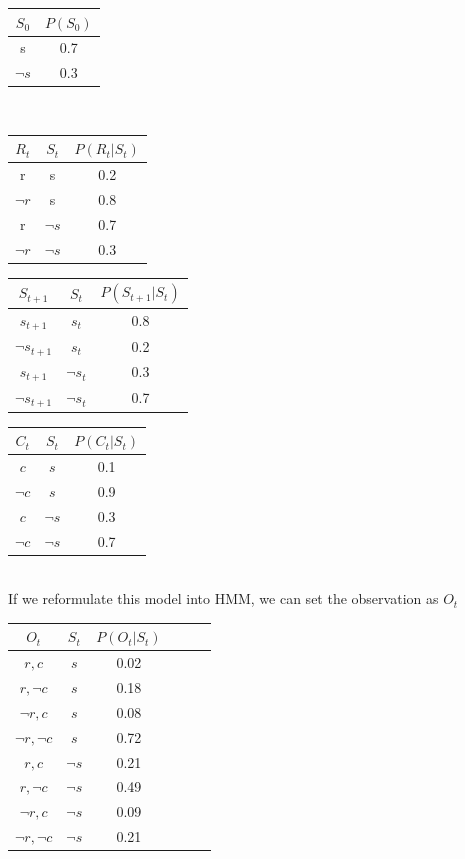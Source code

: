 \documentclass[a4paper,left=2.5cm,right=2.5cm,11pt]{article}
\begin{document}
	\centering
	\begin{tabular}{|c|c|}
		\hline
		$S_0$ & $P(S_0)$\\
		\hline
		s & 0.7 \\
		\hline
		$\lnot s$ & 0.3\\
		\hline
	\end{tabular}
\\
    \begin{tabular}{|c|c|c|}
		\hline
		$R_t$ & $S_t$ & $P(R_t| S_t)$\\
		\hline
		r & s & 0.2 \\
		\hline
		$\lnot r$& s & 0.8\\
		\hline
		 r& $\lnot s $ & 0.7\\
		\hline
		$\lnot r$&$\lnot s$ & 0.3\\		
		\hline
	\end{tabular}
\begin{tabular}{|c|c|c|}
	\hline
	$S_{t+1}$ & $S_t$ & $P(S_{t+1}| S_t)$\\
	\hline
	$s_{t+1}$ & $s_t$ & 0.8 \\
	\hline
	$\lnot s_{t+1}$ & $s_t$ & 0.2\\
	\hline
	$s_{t+1}$& $\lnot s_t $ & 0.3\\
	\hline
	$\lnot s_{t+1}$& $\lnot s_t $& 0.7\\		
	\hline
\end{tabular}
\begin{tabular}{|c|c|c|}
	\hline
	$C_{t}$ & $S_t$ & $P(C_{t}| S_t)$\\
	\hline
	$c$ & $s$ & 0.1 \\
	\hline
	$\lnot c$ & $s$ & 0.9\\
	\hline
	$c$& $\lnot s $ & 0.3\\
	\hline
	$\lnot c$& $\lnot s $& 0.7\\		
	\hline
\end{tabular}\\
If we reformulate this model into HMM, we can set the observation as $O_t$
\begin{tabular}{|c|c|c|c|c|c|}
	\hline
	$O_{t}$ & $S_t$ & $P(O_{t}| S_t)$\\
	\hline
	$r,c$ & $s$ & 0.02 \\
	\hline
	$r,\lnot c$ & $s$ & 0.18\\
	\hline
	$\lnot r, c$ & $s$ & 0.08 \\
	\hline
	$\lnot r, \lnot c$ & $s$ & 0.72\\
	\hline
	$r,c$ & $\lnot s$ & 0.21 \\
	\hline
	$r,\lnot c$ & $\lnot  s$ & 0.49\\
	\hline
	$\lnot r, c$ & $\lnot s$ & 0.09 \\
	\hline
	$\lnot r, \lnot c$ & $\lnot s$ & 0.21\\
	\hline
\end{tabular}
\end{document}
